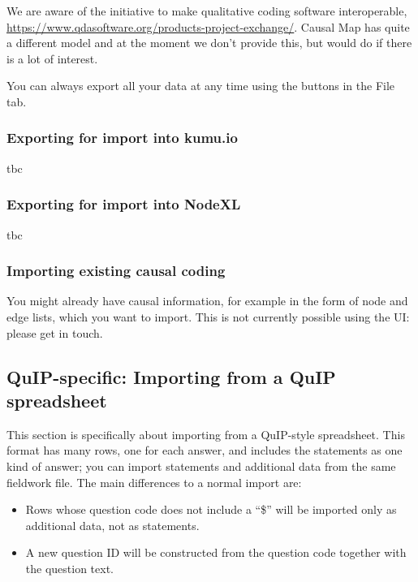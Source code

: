 \documentclass[
]{book}
\providecommand{\tightlist}{%
  \setlength{\itemsep}{0pt}\setlength{\parskip}{0pt}}
\begin{document}
We are aware of the initiative to make qualitative coding software interoperable, \url{https://www.qdasoftware.org/products-project-exchange/}. Causal Map has quite a different model and at the moment we don't provide this, but would do if there is a lot of interest.

You can always export all your data at any time using the buttons in the File tab.

\hypertarget{exporting-for-import-into-kumu.io}{%
\subsubsection{Exporting for import into kumu.io}\label{exporting-for-import-into-kumu.io}}

tbc

\hypertarget{exporting-for-import-into-nodexl}{%
\subsubsection{Exporting for import into NodeXL}\label{exporting-for-import-into-nodexl}}

tbc

\hypertarget{importing-existing-causal-coding}{%
\subsubsection{Importing existing causal coding}\label{importing-existing-causal-coding}}

You might already have causal information, for example in the form of node and edge lists, which you want to import. This is not currently possible using the UI: please get in touch.

\hypertarget{quip-specific-importing-from-a-quip-spreadsheet}{%
\subsection{QuIP-specific: Importing from a QuIP spreadsheet}\label{quip-specific-importing-from-a-quip-spreadsheet}}

This section is specifically about importing from a QuIP-style spreadsheet. This format has many rows, one for each answer, and includes the statements as one kind of answer; you can import statements and additional data from the same fieldwork file. The main differences to a normal import are:

\begin{itemize}
\tightlist
\item
  Rows whose question code does not include a ``\$'' will be imported only as additional data, not as statements.
\item
  A new question ID will be constructed from the question code together with the question text.
\end{itemize}
\end{document}
